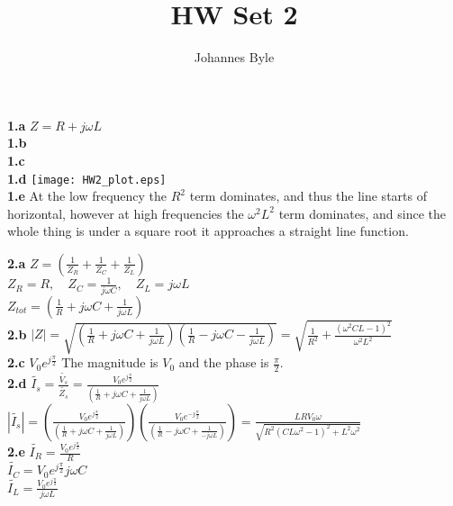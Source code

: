 \documentclass[12pt]{article}
\author{Johannes Byle}
\title{HW Set 2}
\begin{document}
    \maketitle

    \noindent
    \textbf{1.a} $Z=R+j\omega L$\\
    \textbf{1.b} \\
    \textbf{1.c} \\
    \textbf{1.d} \texttt{[image: HW2\_plot.eps]}\\

    \noindent
    \textbf{1.e} At the low frequency the $R^{2}$ term dominates, and thus the line starts of horizontal,
    however at high frequencies the $\omega^{2}L^2$ term dominates, and since the whole thing is under a square root it
    approaches a straight line function.

    \bigskip
    \noindent
    \textbf{2.a} $Z=\left(\frac{1}{Z_R}+\frac{1}{Z_C}+\frac{1}{Z_L}\right)$\\
    $Z_{R}=R,\quad Z_{C}=\frac{1}{j\omega C},\quad Z_{L}=j\omega L$\\
    $Z_{tot}=\left(\frac{1}{R}+j\omega C+\frac{1}{j\omega L}\right)$\\
    \textbf{2.b} $|Z|=\sqrt{\left(\frac{1}{R}+j\omega C+\frac{1}{j\omega L}\right)
    \left(\frac{1}{R}-j\omega C-\frac{1}{j\omega L}\right)}=\sqrt{\frac{1}{R^2}+\frac{(\omega^{2}CL-1)
    ^2}{\omega^{2}L^2}}$\\
    \textbf{2.c} $V_{0}e^{j\frac{\pi}{2}}$ The magnitude is $V_0$ and the phase is $\frac{\pi}{2}$.\\
    \textbf{2.d} $\tilde{I_s}=\frac{\tilde{V_s}}{\tilde{Z_s}}=\frac{V_{0}e^{j\frac{\pi}{2}}}{\left
    (\frac{1}{R}+j\omega C+\frac{1}{j\omega L}\right)}$\\
    $|\tilde{I_s}|=\left(\frac{V_{0}e^{j\frac{\pi}{2}}}{\left(\frac{1}{R}+j\omega C+\frac{1}{j\omega L}\right)
    }\right)\left(\frac{V_{0}e^{-j\frac{\pi}{2}}}{\left(\frac{1}{R}-j\omega C+\frac{1}{-j\omega L}\right)
    }\right)=\frac{LRV_0\omega}{\sqrt{R^{2}(CL\omega^2-1)^{2}+L^2\omega^2}}$\\
    \textbf{2.e} $\tilde{I_R}=\frac{V_{0}e^{j\frac{\pi}{2}}}{R}$\\
    $\tilde{I_C}=V_{0}e^{j\frac{\pi}{2}}j\omega C$\\
    $\tilde{I_L}=\frac{V_{0}e^{j\frac{\pi}{2}}}{j\omega L}$\\
\end{document}
